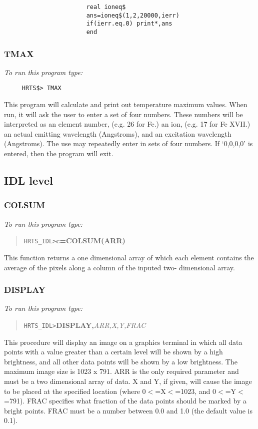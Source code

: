 \begin{verbatim}
                       real ioneq$
                       ans=ioneq$(1,2,20000,ierr)
                       if(ierr.eq.0) print*,ans
                       end

\end{verbatim}

\subsubsection{TMAX}

{\em To run this program type:}
\begin{verbatim}
     HRTS$> TMAX
\end{verbatim}
This program will calculate and print out temperature maximum values.  When
run, it will ask the user to enter a set of four numbers. These numbers will be
interpreted as an element number, (e.g. 26 for Fe.)  an ion, (e.g. 17 for Fe
XVII.) an actual emitting wavelength (Angstroms), and an excitation wavelength
(Angstroms).  The use may repeatedly enter in sets of four numbers.  If
`0,0,0,0' is entered, then the program will exit.

\subsection{IDL level}

\subsubsection{COLSUM}

{\em To run this program type:}

\begin{quote}
     {\tt HRTS\_IDL>}{\bf c=COLSUM(ARR)}
\end{quote}
      This function returns a one dimensional array of which each element
   contains the average of the pixels along a column of the inputed two-
   dimensional array.

\subsubsection{DISPLAY}

{\em To run this program type:}

\begin{quote}
      {\tt HRTS\_IDL>}{\bf DISPLAY,}{\it ARR,X,Y,FRAC}
\end{quote}

This procedure will display an image on a graphics terminal in which all data
points with a value greater than a certain level will be shown by a high
brightness, and all other data points will be shown by a low brightness. The
maximum image size is 1023 x 791. ARR is the only required parameter and must
be a two dimensional array of data.  X and Y, if given, will cause the image to
be placed at the specified location (where 0$<$=X$<$=1023, and 0$<$=Y$<$=791).
FRAC specifies what fraction of the data points should be marked by a bright
points.  FRAC must be a number between 0.0 and 1.0 (the default value is 0.1).

